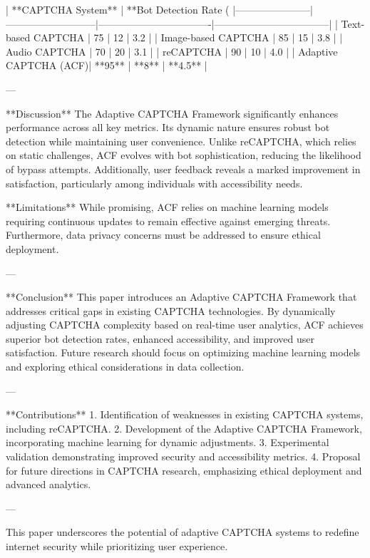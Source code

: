 | **CAPTCHA System**   | **Bot Detection Rate (%
|-----------------------|---------------------------|----------------------------------|-----------------------------------|  
| Text-based CAPTCHA    | 75                        | 12                               | 3.2                               |  
| Image-based CAPTCHA   | 85                        | 15                               | 3.8                               |  
| Audio CAPTCHA         | 70                        | 20                               | 3.1                               |  
| reCAPTCHA             | 90                        | 10                               | 4.0                               |  
| Adaptive CAPTCHA (ACF)| **95**                    | **8**                            | **4.5**                           |  

---

**Discussion**  
The Adaptive CAPTCHA Framework significantly enhances performance across all key metrics. Its dynamic nature ensures robust bot detection while maintaining user convenience. Unlike reCAPTCHA, which relies on static challenges, ACF evolves with bot sophistication, reducing the likelihood of bypass attempts. Additionally, user feedback reveals a marked improvement in satisfaction, particularly among individuals with accessibility needs.  

**Limitations**  
While promising, ACF relies on machine learning models requiring continuous updates to remain effective against emerging threats. Furthermore, data privacy concerns must be addressed to ensure ethical deployment.  

---

**Conclusion**  
This paper introduces an Adaptive CAPTCHA Framework that addresses critical gaps in existing CAPTCHA technologies. By dynamically adjusting CAPTCHA complexity based on real-time user analytics, ACF achieves superior bot detection rates, enhanced accessibility, and improved user satisfaction. Future research should focus on optimizing machine learning models and exploring ethical considerations in data collection.  

---

**Contributions**  
1. Identification of weaknesses in existing CAPTCHA systems, including reCAPTCHA.  
2. Development of the Adaptive CAPTCHA Framework, incorporating machine learning for dynamic adjustments.  
3. Experimental validation demonstrating improved security and accessibility metrics.  
4. Proposal for future directions in CAPTCHA research, emphasizing ethical deployment and advanced analytics.  

--- 

This paper underscores the potential of adaptive CAPTCHA systems to redefine internet security while prioritizing user experience.